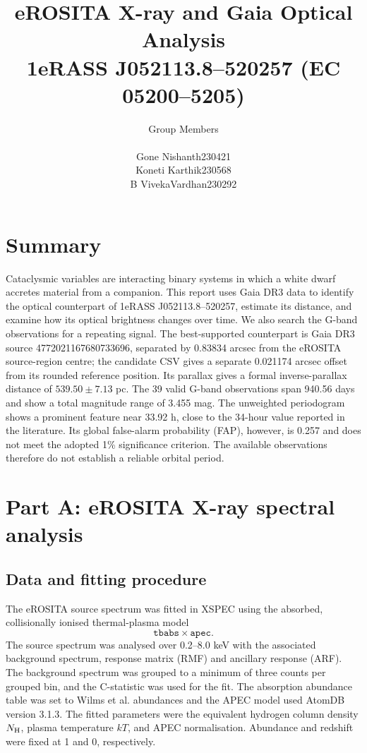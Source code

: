 \documentclass[12pt,a4paper]{article}
\title{\vspace{-1.4em}\color{reportblue}\textbf{eROSITA X-ray and Gaia Optical Analysis}\\[3pt]
\large 1eRASS J052113.8--520257 (EC 05200--5205)}
\author{
\textcolor{reportblue}{\small Group Members}\\[-2pt]
\small\begin{tabular}{lr}Gone Nishanth & 230421\\Koneti Karthik & 230568\\B VivekaVardhan & 230292\end{tabular}}
\date{}
\begin{document}
\maketitle
\thispagestyle{empty}
\vspace{-1.1em}

\section*{Summary}
Cataclysmic variables are interacting binary systems in which a white dwarf accretes material from a companion. This report uses Gaia DR3 data to identify the optical counterpart of 1eRASS J052113.8--520257, estimate its distance, and examine how its optical brightness changes over time. We also search the G-band observations for a repeating signal. The best-supported counterpart is Gaia DR3 source 4772021167680733696, separated by 0.83834 arcsec from the eROSITA source-region centre; the candidate CSV gives a separate 0.021174 arcsec offset from its rounded reference position. Its parallax gives a formal inverse-parallax distance of $539.50\pm7.13$ pc. The 39 valid G-band observations span 940.56 days and show a total magnitude range of 3.455 mag. The unweighted periodogram shows a prominent feature near 33.92 h, close to the 34-hour value reported in the literature. Its global false-alarm probability (FAP), however, is 0.257 and does not meet the adopted 1\% significance criterion. The available observations therefore do not establish a reliable orbital period.


\section{Part A: eROSITA X-ray spectral analysis}
\subsection{Data and fitting procedure}
The eROSITA source spectrum was fitted in XSPEC using the absorbed, collisionally ionised thermal-plasma model
\[
\texttt{tbabs}\times\texttt{apec}.
\]
The source spectrum was analysed over 0.2--8.0 keV with the associated background spectrum, response matrix (RMF) and ancillary response (ARF). The background spectrum was grouped to a minimum of three counts per grouped bin, and the C-statistic was used for the fit. The absorption abundance table was set to Wilms et al. abundances and the APEC model used AtomDB version 3.1.3. The fitted parameters were the equivalent hydrogen column density $N_{\rm H}$, plasma temperature $kT$, and APEC normalisation. Abundance and redshift were fixed at 1 and 0, respectively.
\end{document}
